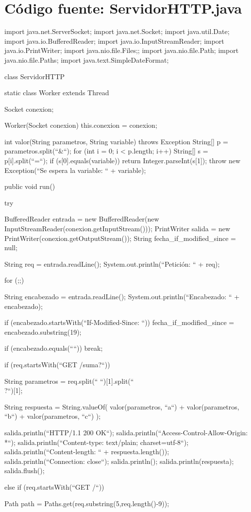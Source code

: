 \documentclass[11pt,a4paper,oneside]{book}
\begin{document}
\chapter{Código fuente: ServidorHTTP.java}
\begin{SourceCode}
import java.net.ServerSocket;
import java.net.Socket;
import java.util.Date;
import java.io.BufferedReader;
import java.io.InputStreamReader;
import java.io.PrintWriter;
import java.nio.file.Files;;
import java.nio.file.Path;
import java.nio.file.Paths;
import java.text.SimpleDateFormat;

class ServidorHTTP
{
  static class Worker extends Thread
  {
    Socket conexion;

    Worker(Socket conexion)
    {
      this.conexion = conexion;
    }

    int valor(String parametros, String variable) throws Exception
    {
      String[] p = parametros.split(``&``);
      for (int i = 0; i < p.length; i++)
      {
        String[] s = p[i].split(``=``);
        if (s[0].equals(variable))
          return Integer.parseInt(s[1]);
      }
      throw new Exception(``Se espera la variable: `` + variable);
    }

    public void run()
    {
      try
      {
        BufferedReader entrada = new BufferedReader(new InputStreamReader(conexion.getInputStream()));
        PrintWriter salida = new PrintWriter(conexion.getOutputStream());
	      String fecha_if_modified_since = null;

        String req = entrada.readLine();
        System.out.println(``Petición: `` + req);

        for (;;)
        {
          String encabezado = entrada.readLine();
          System.out.println(``Encabezado: `` + encabezado);

          if (encabezado.startsWith(``If-Modified-Since: ``))
	          fecha_if_modified_since = encabezado.substring(19);

          if (encabezado.equals(````)) break;
        }

        if (req.startsWith(``GET /suma?``))
        {
          String parametros = req.split(`` ``)[1].split(``\\?``)[1];

          String respuesta = String.valueOf(
            valor(parametros, ``a``) +
            valor(parametros, ``b``) +
            valor(parametros, ``c``)
          );

          salida.println(``HTTP/1.1 200 OK``);
          salida.println(``Access-Control-Allow-Origin: *``);
          salida.println(``Content-type: text/plain; charset=utf-8``);
          salida.println(``Content-length: `` + respuesta.length());
          salida.println(``Connection: close``);
          salida.println();
          salida.println(respuesta);
          salida.flush();
        }
	      else if (req.startsWith(``GET /``))
        {
	        Path path = Paths.get(req.substring(5,req.length()-9));

}}}}}
\end{SourceCode}
\end{document}
